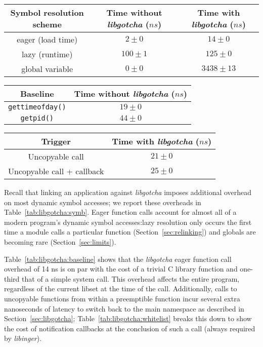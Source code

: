 \begin{table*}
	\begin{minipage}{\textwidth}
	\centering
	\begin{tabular}{c | c c}
	Symbol resolution scheme & Time without \textit{libgotcha} ($ns$) & Time with \textit{libgotcha} ($ns$) \\
	\hline
	eager (load time) & $2 \pm 0$ & $14 \pm 0$ \\
	lazy (runtime) & $100 \pm 1$ & $125 \pm 0$ \\
	global variable & $0 \pm 0$ & $3438 \pm 13$
	\end{tabular}
	\label{tab:libgotcha:symb}
	\end{minipage}

	\begin{minipage}{\columnwidth}
	\centering
	\begin{tabular}{c | c}
	Baseline & Time without \textit{libgotcha} ($ns$) \\
	\hline
	\texttt{gettimeofday()} & $19 \pm 0$ \\
	\texttt{getpid()} & $44 \pm 0$
	\end{tabular}
	\label{tab:libgotcha:baseline}
	\end{minipage}
%
	\begin{minipage}{\columnwidth}
	\centering
	\begin{tabular}{c | c}
	Trigger & Time with \textit{libgotcha} ($ns$) \\
	\hline
	Uncopyable call & $21 \pm 0$ \\
	Uncopyable call + callback & $25 \pm 0$
	\end{tabular}
	\label{tab:libgotcha:whitelist}
	\end{minipage}
\caption{Runtime overheads of accessing dynamic symbols}
\end{table*}

Recall that linking an application against \textit{libgotcha} imposes additional
overhead on most dynamic symbol accesses; we report these overheads in
Table~\ref{tab:libgotcha:symb}.  Eager function calls account for almost all of a
modern program's dynamic symbol accesses:\@ lazy resolution only occurs the first
time a module calls a particular function (Section~\ref{sec:relinking}) and globals
are becoming rare (Section~\ref{sec:limits}).

Table~\ref{tab:libgotcha:baseline} shows that the \textit{libgotcha} eager function
call overhead of 14 ns is on par with the cost of a trivial C library function and
one-third
that of a simple system call.  This overhead affects the entire program, regardless
of the
current libset at the time of the call.  Additionally, calls to
uncopyable functions from within a preemptible function incur several extra
nanoseconds of latency to switch back to the main namespace as described in
Section~\ref{sec:libgotcha}; Table~\ref{tab:libgotcha:whitelist} breaks this down to
show the cost of notification callbacks at the conclusion of such a call (always
required by \textit{libinger}).
